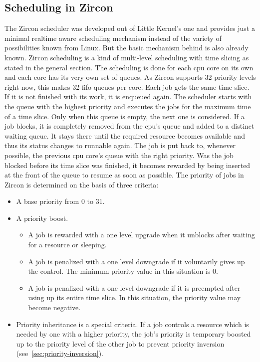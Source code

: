 \subsection{Scheduling in Zircon}
The Zircon scheduler was developed out of Little Kernel's one and provides just a minimal realtime aware scheduling mechanism instead of the variety of possibilities known from Linux.
But the basic mechanism behind is also already known.
Zircon scheduling is a kind of multi-level scheduling with time slicing as stated in the general section.
The scheduling is done for each \ac{cpu} core on its own and each core has its very own set of queues.
As Zircon supports 32 priority levels right now, this makes 32 \ac{fifo} queues per core\cite{zircon-scheduling}.
Each job gets the same time slice.
If it is not finished with its work, it is enqueued again.
The scheduler starts with the queue with the highest priority and executes the jobs for the maximum time of a time slice.
Only when this queue is empty, the next one is considered.
If a job blocks, it is completely removed from the \ac{cpu}'s queue and added to a distinct waiting queue.
It stays there until the required resource becomes available and thus its status changes to runnable again.
The job is put back to, whenever possible, the previous \ac{cpu} core's queue with the right priority.
Was the job blocked before its time slice was finished, it becomes rewarded by being inserted at the front of the queue to resume as soon as possible\cite{zircon-scheduling}.
%
The priority of jobs in Zircon is determined on the basis of three criteria:
\begin{itemize}
    \item A base priority from 0 to 31.
    \item A priority boost. 
        \begin{itemize}
            \item A job is rewarded with a one level upgrade when it unblocks after waiting for a resource or sleeping. 
            \item A job is penalized with a one level downgrade if it voluntarily gives up the control. The minimum priority value in this situation is 0.
            \item A job is penalized with a one level downgrade if it is preempted after using up its entire time slice. In this situation, the priority value may become negative.
        \end{itemize}
    \item Priority inheritance is a special criteria. If a job controls a resource which is needed by one with a higher priority, the job's priority is temporary boosted up to the priority level of the other job to prevent priority inversion (see~\ref{sec:priority-inversion}). 
\end{itemize}
